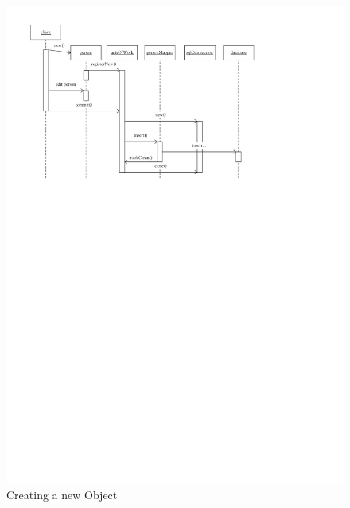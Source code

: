 			\begin{figure}
				\begin{center}
				\thispagestyle{plain}
					\includegraphics{./files/inc/figures/DesignNewObject}
					\caption{\label{fig:designNewObject} Creating a new Object}
				\end{center}
			\end{figure}

